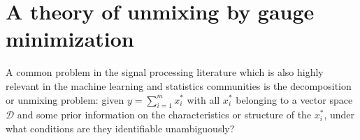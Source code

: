 \documentclass{article}
\begin{document}
%
%
%
%
%
%
%



\section{A theory of unmixing by gauge minimization}

A common problem in the signal processing literature which is also highly relevant in the machine learning and statistics communities is the decomposition or unmixing problem: given $y=\sum_{i=1}^{m}x_{i}^*$ with all $x_{i}^*$ belonging to a vector space $\mathcal{D}$ and some prior information on the characteristics or structure of the $x_{i}^*$, under what conditions are they identifiable unambiguously? 
\end{document}
